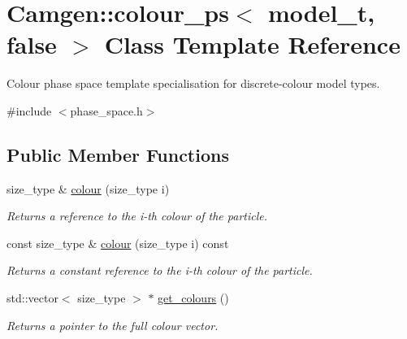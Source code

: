 \hypertarget{a00085}{}\section{Camgen\+:\+:colour\+\_\+ps$<$ model\+\_\+t, false $>$ Class Template Reference}
\label{a00085}


Colour phase space template specialisation for discrete-\/colour model types.  




{\ttfamily \#include $<$phase\+\_\+space.\+h$>$}

\subsection*{Public Member Functions}
\begin{DoxyCompactItemize}
\item 
\hypertarget{a00085_ab8b71e882067212925dddf7ff6aac01e}{}size\+\_\+type \& \hyperlink{a00085_ab8b71e882067212925dddf7ff6aac01e}{colour} (size\+\_\+type i)\label{a00085_ab8b71e882067212925dddf7ff6aac01e}

\begin{DoxyCompactList}\small\item\em Returns a reference to the i-\/th colour of the particle. \end{DoxyCompactList}\item 
\hypertarget{a00085_a5d5b004b3677689d33be82c3195a0a24}{}const size\+\_\+type \& \hyperlink{a00085_a5d5b004b3677689d33be82c3195a0a24}{colour} (size\+\_\+type i) const \label{a00085_a5d5b004b3677689d33be82c3195a0a24}

\begin{DoxyCompactList}\small\item\em Returns a constant reference to the i-\/th colour of the particle. \end{DoxyCompactList}\item 
\hypertarget{a00085_a42d378206afbd7f3fabd25ee420b0808}{}std\+::vector$<$ size\+\_\+type $>$ $\ast$ \hyperlink{a00085_a42d378206afbd7f3fabd25ee420b0808}{get\+\_\+colours} ()\label{a00085_a42d378206afbd7f3fabd25ee420b0808}

\begin{DoxyCompactList}\small\item\em Returns a pointer to the full colour vector. \end{DoxyCompactList}\end{DoxyCompactItemize}


